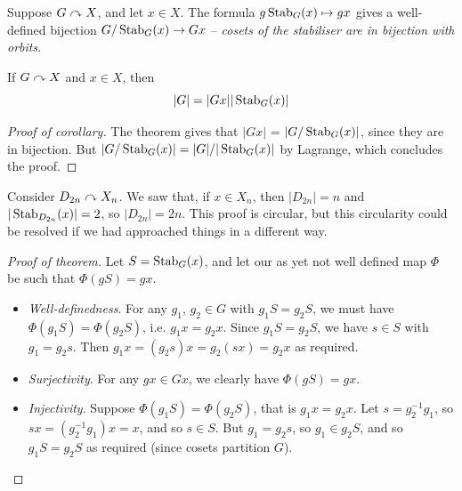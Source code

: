 \documentclass{../../template/note}
\begin{document}
    \begin{theorem}
        Suppose \(G \curvearrowright X\), and let \(x \in X\). The formula \(g \operatorname{Stab}_G(x) \mapsto gx\) gives a well-defined bijection \(G/\operatorname{Stab}_G(x) \to Gx\) -- \emph{cosets of the stabiliser are in bijection with orbits}.
    \end{theorem}
    
    \begin{corollary}
        If \(G \curvearrowright X\) and \(x \in X\), then
        \[
            |G| = |Gx||\operatorname{Stab}_G(x)|
        \]
        \label{orbit-stabiliser-theorem}
    \end{corollary}
    
    \begin{proof}[Proof of corollary]
        The theorem gives that \(|Gx|\) = \(|G/\operatorname{Stab}_G(x)|\), since they are in bijection. But \(|G/\operatorname{Stab}_G(x)| = |G|/|\operatorname{Stab}_G(x)|\) by Lagrange, which concludes the proof.
    \end{proof}
    
    \begin{example*}
        Consider \(D_{2n} \curvearrowright X_n\). We saw that, if \(x \in X_n\), then \(|D_{2n}| = n\) and \(|\operatorname{Stab}_{D_{2n}}(x)| = 2\), so \(|D_{2n}| = 2n\). This proof is circular, but this circularity could be resolved if we had approached things in a different way.
    \end{example*}
    
    \begin{proof}[Proof of theorem]
        Let \(S = \operatorname{Stab}_G(x)\), and let our as yet not well defined map \(\Phi\) be such that \(\Phi(gS) = gx\).
        \begin{itemize}
            \item \emph{Well-definedness}. For any \(g_1\), \(g_2 \in G\) with \(g_1S = g_2S\), we must have \(\Phi(g_1S) = \Phi(g_2S)\), i.e. \(g_1x = g_2x\). Since \(g_1S = g_2S\), we have \(s \in S\) with \(g_1 = g_2s\). Then \(g_1x = (g_2s)x = g_2(sx) = g_2x\) as required.
            \item \emph{Surjectivity}. For any \(gx \in Gx\), we clearly have \(\Phi(gS) = gx\).
            \item \emph{Injectivity}. Suppose \(\Phi(g_1S) = \Phi(g_2S)\), that is \(g_1x = g_2x\). Let \(s = g_2^{-1}g_1\), so \(sx = (g_2^{-1}g_1)x = x\), and so \(s \in S\). But \(g_1 = g_2s\), so \(g_1 \in g_2S\), and so \(g_1S = g_2S\) as required (since cosets partition \(G\)).
        \end{itemize}
    \end{proof}
    
\end{document}
